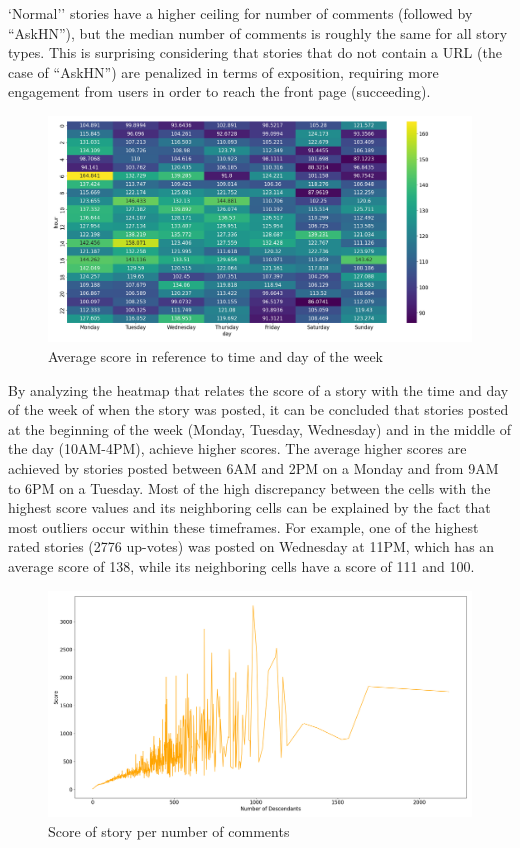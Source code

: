 \documentclass[sigconf]{acmart}
\begin{document}
`Normal'' stories have a higher ceiling for number of comments (followed
by ``AskHN''), but the median number of comments is roughly the same for
all story types. This is surprising considering that stories that do not
contain a URL (the case of ``AskHN'') are penalized in terms of exposition,
requiring more engagement from users in order to reach the front page
(succeeding).

\begin{figure}[htb!]
   \centering
   \includegraphics[width=\linewidth]{fig/heatmap_score_per_dayandhour.png}
    \caption{Average score in reference to time and day of the week}
    \label{fig:heatmap_score_per_dayandhour}
\end{figure}

By analyzing the heatmap that relates the score of a story with the time
and day of the week of when the story was posted, it can be concluded that
stories posted at the beginning of the week (Monday, Tuesday, Wednesday)
and in the middle of the day (10AM-4PM), achieve higher scores. The average
higher scores are achieved by stories posted between 6AM and 2PM on a
Monday and from 9AM to 6PM on a Tuesday. Most of the high discrepancy between
the cells with the highest score values and its neighboring cells can be
explained by the fact that most outliers occur within these timeframes.
For example, one of the highest rated stories (2776 up-votes) was posted
on Wednesday at 11PM, which has an average score of 138, while its
neighboring cells have a score of 111 and 100.

\begin{figure}[htb!]
   \centering
   \includegraphics[width=\linewidth]{fig/score_per_descendants.png}
    \caption{Score of story per number of comments}
    \label{fig:heatmap_score_per_dayandhour}
\end{figure}
\end{document}
